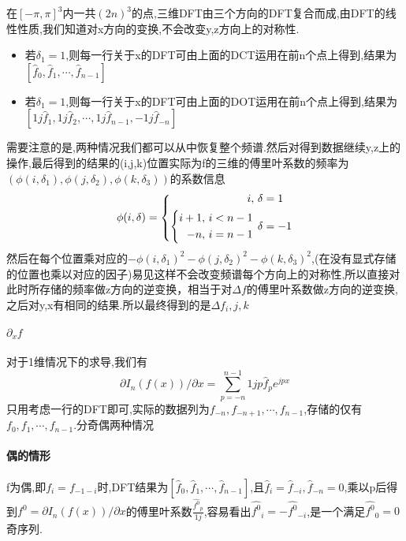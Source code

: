 \documentclass[UTF8]{ctexart}
\begin{document}
在$[-\pi,\pi]^3$内一共$(2n)^3$的点,三维DFT由三个方向的DFT复合而成,由DFT的线性性质,我们知道对x方向的变换,不会改变y,z方向上的对称性.
\begin{itemize}
  \item 若$\delta_1=1$,则每一行关于x的DFT可由上面的DCT运用在前n个点上得到,结果为 $[\hat{f}_0,\hat{f}_1,\cdots,\hat{f}_{n-1}]$
  \item 若$\delta_1=1$,则每一行关于x的DFT可由上面的DOT运用在前n个点上得到,结果为 $[1j\hat{f}_1,1j\hat{f}_2,\cdots,1j\hat{f}_{n-1},-1j\hat{f}_{-n}]$
\end{itemize}
需要注意的是,两种情况我们都可以从中恢复整个频谱.然后对得到数据继续y,z上的操作,最后得到的结果的(i,j,k)位置实际为f的三维的傅里叶系数的频率为$(\phi(i,\delta_1),\phi(j,\delta_2),\phi(k,\delta_3))$的系数信息
\begin{equation*}
  \phi(i,\delta)=\left\{
  \begin{aligned}
     i ,&\  \delta = 1 \\\smash[]{  \left\{
     \begin{aligned}
        i+1 ,&\  i<n-1 \\
         -n ,&\  i=n-1 \\
     \end{aligned}\right.}  &\  \delta =-1 \\
  \end{aligned} \right.
\end{equation*}
然后在每个位置乘对应的$-\phi(i,\delta_1)^2-\phi(j,\delta_2)^2-\phi(k,\delta_3)^2$,(在没有显式存储的位置也乘以对应的因子)易见这样不会改变频谱每个方向上的对称性,所以直接对此时所存储的频率做z方向的逆变换，相当于对$\Delta f$的傅里叶系数做z方向的逆变换,之后对y,x有相同的结果.所以最终得到的是$\Delta f_i,j,k$
\paragraph{$\partial_x f$}
对于1维情况下的求导,我们有
$$
\partial I_n(f(x))/\partial x =  \sum\limits_{p=-n}^{n-1}1jp\hat{f}_p e^{jpx}
$$
只用考虑一行的DFT即可,实际的数据列为$f_{-n},f_{-n+1},\cdots,f_{n-1}$,存储的仅有$f_0,f_1,\cdots,f_{n-1}$.分奇偶两种情况
\paragraph{偶的情形}
  f为偶,即$f_i=f_{-1-i}$时,DFT结果为$[\hat{f}_0,\hat{f}_1,\cdots,\hat{f}_{n-1}]$,且$\hat{f}_i=\hat{f}_{-i},\hat{f}_{-n}=0$,乘以p后得到$f^0=\partial I_n(f(x))/\partial x $的傅里叶系数$ \frac{\hat{f^0}_p}{1j}$,容易看出$\hat{f^0}_i=-\hat{f^0}_{-i}$,是一个满足$\hat{f^0}_0=0$奇序列.
  
\end{document}
